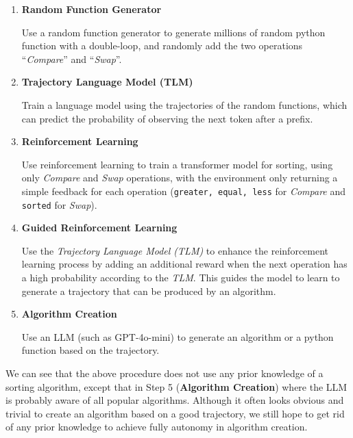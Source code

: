 \documentclass[pdflatex,sn-mathphys-num]{sn-jnl}%
\theoremstyle{thmstyleone}%
\theoremstyle{thmstyletwo}%
\theoremstyle{thmstylethree}%
\begin{document}
\begin{enumerate}
    \item \textbf{Random Function Generator}
    
        \par \noindent Use a random function generator to generate millions of random python function with a double-loop, and randomly add the two operations ``\emph{Compare}'' and ``\emph{Swap}''.
        
    \item \textbf{Trajectory Language Model (TLM)}
    
        \par \noindent Train a language model using the trajectories of the random functions, which can predict the probability of observing the next token after a prefix.
        
    \item \textbf{Reinforcement Learning}
    
        \par \noindent Use reinforcement learning to train a transformer model for sorting, using only \emph{Compare} and \emph{Swap} operations, with the environment only returning a simple feedback for each operation (\texttt{greater, equal, less} for \emph{Compare} and \texttt{sorted} for \emph{Swap}).
        
    \item \textbf{Guided Reinforcement Learning}
    
        \par \noindent Use the \emph{Trajectory Language Model (TLM)} to enhance the reinforcement learning process by adding an additional reward when the next operation has a high probability according to the \emph{TLM}. This guides the model to learn to generate a trajectory that can be produced by an algorithm.

    \item \textbf{Algorithm Creation}

        \par \noindent Use an LLM (such as GPT-4o-mini) to generate an algorithm or a python function based on the trajectory.
    
\end{enumerate}

We can see that the above procedure does not use any prior knowledge of a sorting algorithm, except that in Step 5 (\textbf{Algorithm Creation}) where the LLM is probably aware of all popular algorithms. Although it often looks obvious and trivial to create an algorithm based on a good trajectory, we still hope to get rid of any prior knowledge to achieve fully autonomy in algorithm creation.
\end{document}
